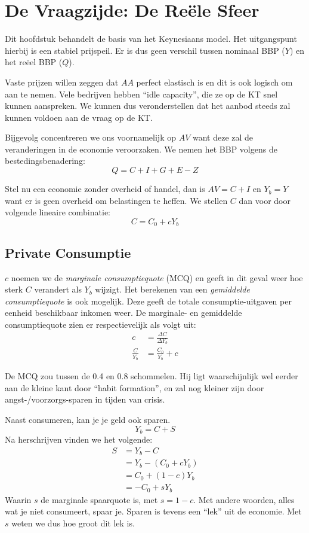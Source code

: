 \section{De Vraagzijde: De Re\"ele Sfeer}

Dit hoofdstuk behandelt de basis van het Keynesiaans model. Het uitgangspunt hierbij is een stabiel prijspeil. Er is dus geen verschil tussen nominaal BBP ($Y$) en het re\"eel BBP ($Q$).

Vaste prijzen willen zeggen dat $AA$ perfect elastisch is en dit is ook logisch om aan te nemen. Vele bedrijven hebben ``idle capacity'', die ze op de KT snel kunnen aanspreken. We kunnen dus veronderstellen dat het aanbod steeds zal kunnen voldoen aan de vraag op de KT.

Bijgevolg concentreren we ons voornamelijk op $AV$ want deze zal de veranderingen in de economie veroorzaken. We nemen het BBP volgens de bestedingsbenadering:
\begin{equation}
  Q = C + I + G + E - Z
\end{equation}

Stel nu een economie zonder overheid of handel, dan is $AV = C + I$ en $Y_b = Y$ want er is geen overheid om belastingen te heffen. We stellen $C$ dan voor door volgende lineaire combinatie:
\begin{equation}
  C = C_0 + c Y_b
\end{equation}

\subsection{Private Consumptie}

$c$ noemen we de \textit{marginale consumptiequote} (MCQ) en geeft in dit geval weer hoe sterk $C$ verandert als $Y_b$ wijzigt. Het berekenen van een \textit{gemiddelde consumptiequote} is ook mogelijk. Deze geeft de totale consumptie-uitgaven per eenheid beschikbaar inkomen weer. De marginale- en gemiddelde consumptiequote zien er respectievelijk als volgt uit:
\begin{align}
  c &= \frac{\Delta C}{\Delta Y_b}\\
  \frac{C}{Y_b} &= \frac{C_0}{Y_b} + c
\end{align}

De MCQ zou tussen de 0.4 en 0.8 schommelen. Hij ligt waarschijnlijk wel eerder aan de kleine kant door ``habit formation'', en zal nog kleiner zijn door angst-/voorzorgs-sparen in tijden van crisis.

Naast consumeren, kan je je geld ook sparen.
\begin{equation}
  Y_b = C + S
\end{equation}
Na herschrijven vinden we het volgende:
\begin{align*}
  S &= Y_b - C \\
  &= Y_b - (C_0 + cY_b) \\
  &= C_0 + (1-c)Y_b \\
  &= -C_0 + sY_b
\end{align*}
Waarin $s$ de marginale spaarquote is, met $s = 1 - c$. Met andere woorden, alles wat je niet consumeert, spaar je. Sparen is tevens een ``lek'' uit de economie. Met $s$ weten we dus hoe groot dit lek is.

